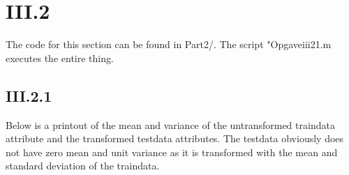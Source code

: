 \documentclass{article}
\begin{document}
\section{III.2}

The code for this section can be found in Part2/. The script
"Opgaveiii21.m executes the entire thing.

\subsection{III.2.1}

Below is a printout of the mean and variance of the untransformed
traindata attribute and the transformed testdata attributes. The
testdata obviously does not have zero mean and unit variance as it is
transformed with the mean and standard deviation of the traindata.
\end{document}
